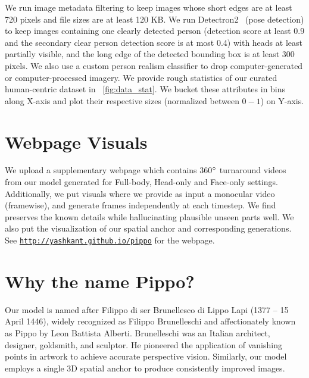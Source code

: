 {We run image metadata filtering to keep images whose short edges are at least 720 pixels and file sizes are at least 120 KB.
We run Detectron2~\cite{wu2019detectron2} (pose detection) to keep images containing one clearly detected person (detection score at least 0.9 and the secondary clear person detection score is at most 0.4) with heads at least partially visible, and the long edge of the detected bounding box is at least 300 pixels.
We also use a custom person realism classifier to drop computer-generated or computer-processed imagery.
We provide rough statistics of our curated human-centric dataset in ~\cref{fig:data_stat}. We bucket these attributes in bins along X-axis and plot their respective sizes (normalized between $0-1$) on Y-axis. 









\section{Webpage Visuals}

 We upload a supplementary webpage which contains 360$^{\circ}$ turnaround videos from our model generated for Full-body, Head-only and Face-only settings. Additionally, we put visuals where we provide as input a monocular video (framewise), and generate frames independently at each timestep. We find \ourmodel preserves the known details while hallucinating plausible unseen parts well. We also put the visualization of our spatial anchor and corresponding generations. See \texttt{\url{http://yashkant.github.io/pippo}} for the webpage.
\vspace{5pt}




\section{Why the name Pippo?}

Our model is named after Filippo di ser Brunellesco di Lippo Lapi (1377 – 15 April 1446), widely recognized as Filippo Brunelleschi and affectionately known as Pippo by Leon Battista Alberti. 
Brunelleschi was an Italian architect, designer, goldsmith, and sculptor. 
He pioneered the application of vanishing points in artwork to achieve accurate perspective vision. Similarly, our model employs a single 3D spatial anchor to produce consistently improved images. 


}
